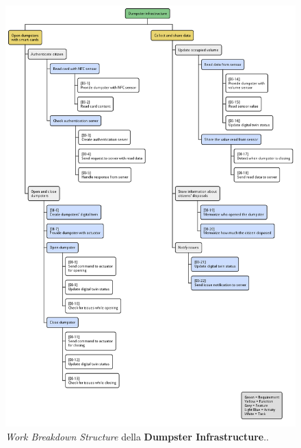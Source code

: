 \begin{figure}[H]
    \centering
    \includegraphics[width=\textwidth]{../img/wbs-dumpster-infrastructure.pm}
    \caption{\textit{Work Breakdown Structure} della \textbf{Dumpster Infrastructure}..}
    \label{fig:wbs-dumpster-infrastructure}
\end{figure}


